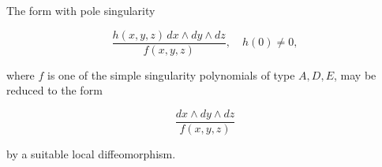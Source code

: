 The form with pole singularity

$$\frac{h(x, y, z) \, dx \wedge dy \wedge dz}{f(x, y, z)}, \quad h(0) \neq 0,$$

where $f$ is one of the simple singularity polynomials of type $A, D, E$, may be reduced to the form

$$\frac{dx \wedge dy \wedge dz}{f(x, y, z)}$$

by a suitable local diffeomorphism.
